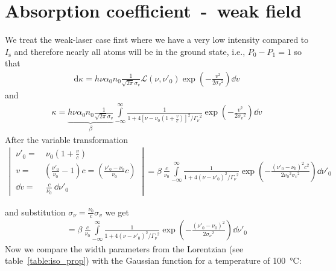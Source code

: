 \section{\label{sec:weakfield}Absorption coefficient~-~weak field}   %

We treat the weak-laser case first where we have a very low intensity compared to \(I_\mathrm{s}\) and
therefore nearly all atoms will be in the ground state, i.e., \(P_0-P_1 = 1 \) so that
\begin{align}
    \mathrm{d}\kappa = h\nu \alpha_0 n_0 \frac{1}{\sqrt{2\pi}\sigma_v} \mathcal{L}(\nu,\nu'_0) \exp{ \left( -\frac{v^2}{2 {\sigma_v}^2} \right ) } \dd v
\end{align}
and
\begin{align}
    \kappa = \underbrace{ h\nu \alpha_0 n_0 \frac{1}{\sqrt{2\pi}\sigma_v} }_{\beta} 
    \int\limits_{-\infty}^{\infty} \frac{1}{ 1+4 {\left [\nu-\nu_0\left ( 1 + \frac{v}{c} \right) \right] }^2 / {\Gamma_\nu}^2 } 
    \exp{ \left (-\frac{v^2}{ 2{\sigma_v}^2 }\right ) } \dd v
\end{align}
After the variable transformation
\begin{align*}
\left |~
    \begin{aligned}
        \nu'_0 =&~\nu_0\left ( 1+ \frac{v}{c} \right) \\
        v =&\left ( \frac{\nu'_0}{\nu_0} - 1 \right) c =\left( \frac{\nu'_0 - \nu_0}{\nu_0} c\right) \\
        \dd v =&~\frac{c}{\nu_0}~\dd \nu'_0
    \end{aligned}
~\right |~ = \beta~\frac{c}{\nu_0} \int\limits_{-\infty}^{\infty} \frac{1}{ 1+4 {(\nu-\nu'_0)}^2 / {\Gamma_\nu}^2 } 
\exp{ \left ( -\frac{{(\nu'_0 - \nu_0)}^2 c^2 }{2 {\nu_0}^2 {\sigma_v}^2 } \right )} \dd \nu'_0
\end{align*} 

and substitution \(\sigma_\nu = \frac{\nu_0}{c} \sigma_v \) we get
\begin{align}
    = \beta~\frac{c}{\nu_0} \int\limits_{-\infty}^{\infty} \frac{1}{ 1+4 {(\nu-\nu'_0)}^2 / {\Gamma_\nu}^2 } 
\exp{ \left ( -\frac{{(\nu'_0 - \nu_0)}^2 }{2 {\sigma_\nu}^2 } \right )} \dd \nu'_0 \label{eq:intlorgau}
\end{align}
Now we compare the width parameters from the Lorentzian (see table~\ref{table:iso_prop}) with the Gaussian function for a temperature of \SI{100}{\degreeCelsius}:

